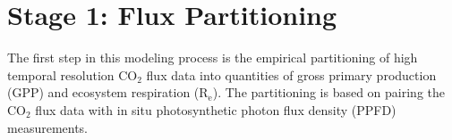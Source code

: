 %
%
%
%
%
\section{Stage 1: Flux Partitioning}
\label{sec:mst1}
The first step in this modeling process is the empirical partitioning of high temporal resolution CO$_{2}$ flux data into quantities of gross primary production (GPP) and ecosystem respiration (R$_{\mathrm{e}}$).  
The partitioning is based on pairing the CO$_{2}$ flux data with in situ photosynthetic photon flux density (PPFD) measurements.

